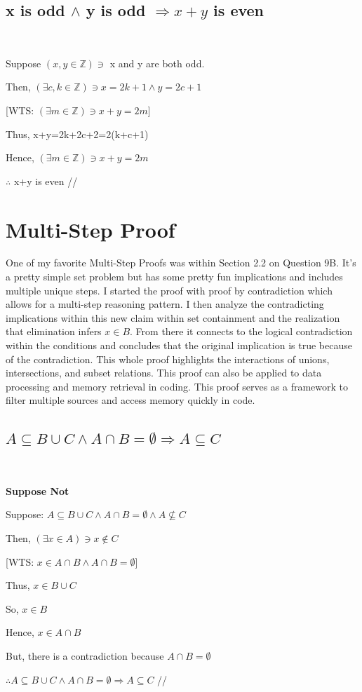 \documentclass{article}
\begin{document}
\newpage
\subsection{x is odd $\wedge$ y is odd $\Rightarrow x+y$ is even}
\
\begin{center}
\raggedright
Suppose $(x, y \in \mathbb{Z}) \ni$ x and y are both odd.

Then, $(\exists c, k  \in \mathbb{Z}) \ni x=2k+1 \wedge y=2c+1$

[WTS: $(\exists m  \in \mathbb{Z}) \ni x+y=2m$]

Thus, x+y=2k+2c+2=2(k+c+1)

Hence, $(\exists m  \in \mathbb{Z}) \ni x+y=2m$

$\therefore$ x+y is even  //

\end{center}

\newpage
\section{Multi-Step Proof}
\justifying
One of my favorite Multi-Step Proofs was within Section 2.2 on Question 9B. It's a pretty simple set problem but has some pretty fun implications and includes multiple unique steps. I started the proof with proof by contradiction which allows for a multi-step reasoning pattern. I then analyze the contradicting implications within this new claim within set containment and the realization that elimination infers $x \in B$. From there it connects to the logical contradiction within the conditions and concludes that the original implication is true because of the contradiction. This whole proof highlights the interactions of unions, intersections, and subset relations. This proof can also be applied to data processing and memory retrieval in coding. This proof serves as a framework to filter multiple sources and access memory quickly in code.

\newpage
\subsection{$A \subseteq B \cup C \wedge A \cap B = \emptyset \Rightarrow A \subseteq C$}
\
\begin{center}
\raggedright
\textbf{Suppose Not}

Suppose:  $A \subseteq B \cup C \wedge A \cap B = \emptyset \wedge A \nsubseteq C$

Then, $(\exists x\in A) \ni x \notin C$

[WTS: $x \in A \cap B \wedge A \cap B=\emptyset$]

Thus, $x\in B \cup C$

So, $x \in B$

Hence, $x \in A \cap B$

But, there is a contradiction because $A \cap B = \emptyset$

$\therefore A \subseteq B \cup C \wedge A \cap B = \emptyset \Rightarrow A \subseteq C$  //


\end{center}
\end{document}
